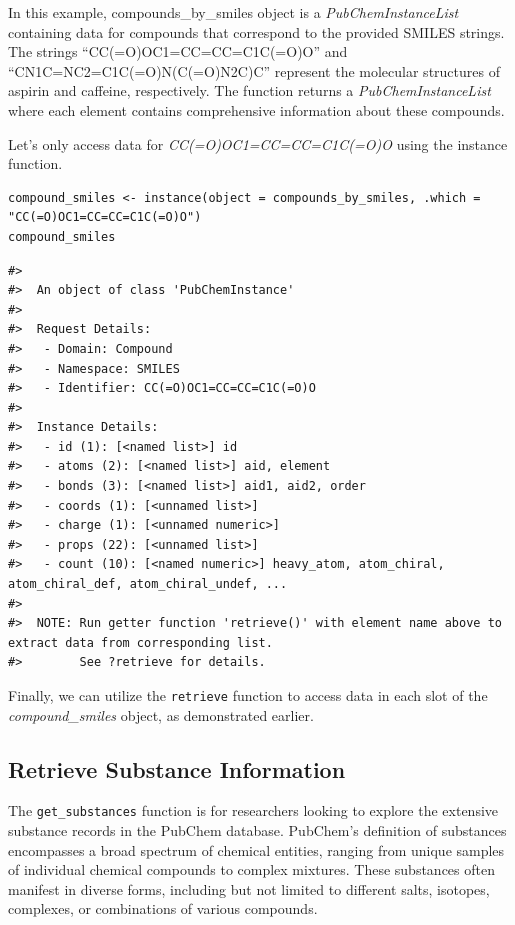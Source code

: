 In this example, compounds\_by\_smiles object is a \emph{PubChemInstanceList} containing data for compounds that correspond to the provided SMILES strings. The strings ``CC(=O)OC1=CC=CC=C1C(=O)O'' and ``CN1C=NC2=C1C(=O)N(C(=O)N2C)C'' represent the molecular structures of aspirin and caffeine, respectively. The function returns a \emph{PubChemInstanceList} where each element contains comprehensive information about these compounds.

Let's only access data for \emph{CC(=O)OC1=CC=CC=C1C(=O)O} using the instance function.

\begin{verbatim}
compound_smiles <- instance(object = compounds_by_smiles, .which = "CC(=O)OC1=CC=CC=C1C(=O)O")
compound_smiles
\end{verbatim}

\begin{verbatim}
#> 
#>  An object of class 'PubChemInstance'
#> 
#>  Request Details:  
#>   - Domain: Compound
#>   - Namespace: SMILES
#>   - Identifier: CC(=O)OC1=CC=CC=C1C(=O)O
#> 
#>  Instance Details:  
#>   - id (1): [<named list>] id
#>   - atoms (2): [<named list>] aid, element
#>   - bonds (3): [<named list>] aid1, aid2, order
#>   - coords (1): [<unnamed list>] 
#>   - charge (1): [<unnamed numeric>] 
#>   - props (22): [<unnamed list>] 
#>   - count (10): [<named numeric>] heavy_atom, atom_chiral, atom_chiral_def, atom_chiral_undef, ...
#> 
#>  NOTE: Run getter function 'retrieve()' with element name above to extract data from corresponding list. 
#>        See ?retrieve for details.
\end{verbatim}

Finally, we can utilize the \texttt{retrieve} function to access data in each slot of the \emph{compound\_smiles} object, as demonstrated earlier.

\hypertarget{retrieve-substance-information}{%
\subsection{Retrieve Substance Information}\label{retrieve-substance-information}}

The \texttt{get\_substances} function is for researchers looking to explore the extensive substance records in the PubChem database. PubChem's definition of substances encompasses a broad spectrum of chemical entities, ranging from unique samples of individual chemical compounds to complex mixtures. These substances often manifest in diverse forms, including but not limited to different salts, isotopes, complexes, or combinations of various compounds.

